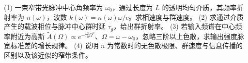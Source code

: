 (1) 一束窄带光脉冲中心角频率为 \(\omega_0\)，通过长度为 \(L\) 的透明均匀介质，其频率折射率为 \(n(\omega)\)，波数 \(k(\omega)=n(\omega)\omega/c\)。求相速度与群速度。
(2) 求通过介质产生的载波相位与脉冲中心群时延 \(\tau_g\)，给出群折射率。
(3) 若输入频谱在中心频率附近为高斯 \(\tilde A(\Omega)\propto e^{-\tau_0^2\Omega^2}\)、\(\Omega=\omega-\omega_0\)，忽略三阶以上色散，求输出强度脉宽标准差的增长规律。
(4) 说明 \(n\) 为常数时的无色散极限、群速度与信息传播的区别以及该近似的窄带条件。
